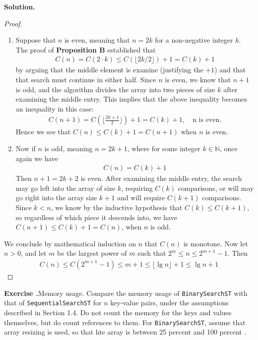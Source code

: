 \documentclass[12pt, a4paper]{article}
\newenvironment{ex}[2][Exercise]
{\par\medskip\noindent \textbf{#1 #2.}}
{\medskip}
\newenvironment{sol}[1][Solution]
{\par\medskip\noindent \textbf{#1.} }
{\medskip}
\begin{document}
\begin{sol}
\begin{proof}
			\begin{enumerate}[label=(\roman*)]
				\item Suppose that $n$ is even, meaning that $n=2 k$ for a non-negative
				integer $k$. The proof of \textbf{Proposition B} established that
				\begin{align*}
					C(n)=C(2\cdot k)\leq C(\lfloor 2k / 2\rfloor) + 1 = C(k) + 1
				\end{align*}
				by arguing that the middle element is examine (justifying the $+1$)
				and that that search must continue in either half.
				Since $n$ is even, we know that $n+1$ is odd, and the algorithm divides
				the array into two pieces of size $k$ after examining the middle entry.
				This implies that the above inequality becomes an inequality in this
				case:
				\begin{align*}
					C(n + 1) = C(\lfloor \frac{2k+1}{2}\rfloor) + 1 = C(k)+1,\quad \text{n is even}.
				\end{align*}
				Hence we see that $C(n)\leq C(k)+1=C(n+1)$ when $n$ is even.
				\item Now if $n$ is odd, meaning $n=2k+1$, where for some integer $k\in\mathbb{N}$,
				once again we have
				\begin{align*}
					C(n)=C(k) + 1
				\end{align*}
				Then $n+1=2k+2$ is even. After examining the middle entry, the search may go left
				into the array of size $k$, requiring $C(k)$ comparisons, or will may go right
				into the array size $k+1$ and will require $C(k+1)$ comparisons. Since $k<n$,
				we know by the inductive hypothesis that $C(k)\leq C(k+1)$, so regardless
				of which piece it descends into, we have $C(n+1)\leq C(k)+1=C(n)$, when
				$n$ is odd.
			\end{enumerate}
			We conclude by mathematical induction on $n$ that $C(n)$ is monotone.
			Now let $n>0$, and let $m$ be the largest power of $m$ such that
			$2^m\leq n\leq  2^{m+1} - 1$. Then
			\begin{align*}
				C(n)\leq C(2^{m+1}-1)\leq m+1\leq \lfloor \lg n\rfloor +1 \leq \lg n + 1
			\end{align*}
		\end{proof}
	\end{sol}
	\begin{ex}{21}
		\emph{Memory usage}. Compare the memory usage of \texttt{BinarySearchST} with that
		of \texttt{SequentialSearchST} for $n$ key-value pairs, under the assumptions described
		in Section 1.4. Do not count the memory for the keys and values themselves, but
		do count references to them. For \texttt{BinarySearchST}, assume that array resizing
		is used, so that hte array is between 25 percent and 100 percent .
	\end{ex}
\end{document}
